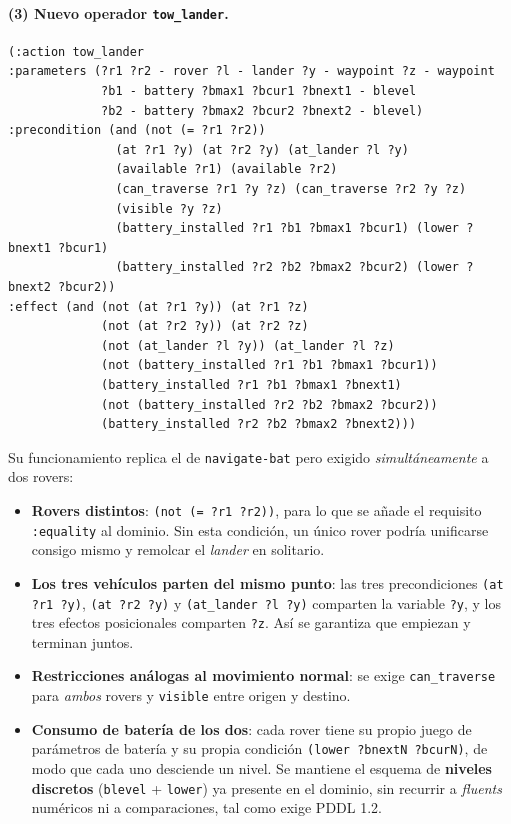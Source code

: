 \documentclass[12pt,a4paper]{article}
\begin{document}
\paragraph{(3) Nuevo operador \texttt{tow\_lander}.}

\begin{lstlisting}
(:action tow_lander
:parameters (?r1 ?r2 - rover ?l - lander ?y - waypoint ?z - waypoint
             ?b1 - battery ?bmax1 ?bcur1 ?bnext1 - blevel
             ?b2 - battery ?bmax2 ?bcur2 ?bnext2 - blevel)
:precondition (and (not (= ?r1 ?r2))
               (at ?r1 ?y) (at ?r2 ?y) (at_lander ?l ?y)
               (available ?r1) (available ?r2)
               (can_traverse ?r1 ?y ?z) (can_traverse ?r2 ?y ?z)
               (visible ?y ?z)
               (battery_installed ?r1 ?b1 ?bmax1 ?bcur1) (lower ?bnext1 ?bcur1)
               (battery_installed ?r2 ?b2 ?bmax2 ?bcur2) (lower ?bnext2 ?bcur2))
:effect (and (not (at ?r1 ?y)) (at ?r1 ?z)
             (not (at ?r2 ?y)) (at ?r2 ?z)
             (not (at_lander ?l ?y)) (at_lander ?l ?z)
             (not (battery_installed ?r1 ?b1 ?bmax1 ?bcur1))
             (battery_installed ?r1 ?b1 ?bmax1 ?bnext1)
             (not (battery_installed ?r2 ?b2 ?bmax2 ?bcur2))
             (battery_installed ?r2 ?b2 ?bmax2 ?bnext2)))
\end{lstlisting}

Su funcionamiento replica el de \texttt{navigate-bat} pero exigido
\emph{simult\'aneamente} a dos rovers:

\begin{itemize}[leftmargin=*]
\item \textbf{Rovers distintos}: \texttt{(not (= ?r1 ?r2))}, para lo que se
a\~nade el requisito \texttt{:equality} al dominio. Sin esta condici\'on, un
\'unico rover podr\'ia unificarse consigo mismo y remolcar el \emph{lander}
en solitario.
\item \textbf{Los tres veh\'iculos parten del mismo punto}: las tres
precondiciones \texttt{(at ?r1 ?y)}, \texttt{(at ?r2 ?y)} y
\texttt{(at\_lander ?l ?y)} comparten la variable \texttt{?y}, y los tres
efectos posicionales comparten \texttt{?z}. As\'i se garantiza que empiezan y
terminan juntos.
\item \textbf{Restricciones an\'alogas al movimiento normal}: se exige
\texttt{can\_traverse} para \emph{ambos} rovers y \texttt{visible} entre
origen y destino.
\item \textbf{Consumo de bater\'ia de los dos}: cada rover tiene su propio
juego de par\'ametros de bater\'ia y su propia condici\'on
\texttt{(lower ?bnextN ?bcurN)}, de modo que cada uno desciende un nivel. Se
mantiene el esquema de \textbf{niveles discretos} (\texttt{blevel} +
\texttt{lower}) ya presente en el dominio, sin recurrir a \emph{fluents}
num\'ericos ni a comparaciones, tal como exige PDDL 1.2.
\end{itemize}
\end{document}

